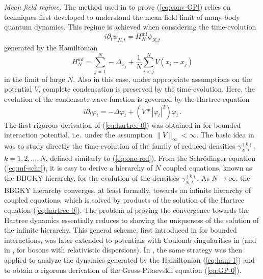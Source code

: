 \documentclass[11pt,a4paper]{article}
\begin{document}
\bigskip

{\it Mean field regime.} The method used in \cite{ESY0,ESY1,ESY2,ESY3,ESY4} 
to prove (\ref{eq:conv-GP}) relies on techniques first developed to understand the mean field limit of many-body quantum dynamics. This regime is achieved when considering the time-evolution 
\begin{equation}\label{eq:mf-schr}
i\partial_t \psi_{N,t} = H_N^{\text{mf}} \psi_{N,t} 
\end{equation}
generated by the Hamiltonian
\begin{equation}\label{eq:ham-mf} H_N^{\text{mf}} = \sum_{j=1}^N -\Delta_{x_j} + \frac{1}{N} \sum_{i<j}^N V (x_i -x_j) \end{equation}
in the limit of large $N$. Also in this case, under appropriate assumptions on the potential $V$, 
complete condensation is preserved by the time-evolution. Here, the evolution of the condensate wave function is governed by the Hartree equation
\begin{equation}\label{eq:hartree-0} i\partial_t \varphi_t = -\Delta \varphi_t + \left( V * |\varphi_t|^2\right) \varphi_t \,. \end{equation}
The first rigorous derivation of (\ref{eq:hartree-0}) was obtained in \cite{S} for bounded interaction potential, i.e.\ under the assumption $\| V \|_\infty < \infty$. The basic idea in \cite{S} was to study directly the time-evolution of the family of reduced densities $\gamma^{(k)}_{N,t}$, $k =1 ,2, \dots , N$, defined similarly to (\ref{eq:one-red}).  {F}rom the Schr\"odinger equation (\ref{eq:mf-schr}), it is easy to derive a hierarchy of $N$ coupled equations, known as the BBGKY hierarchy, for the evolution of the densities $\gamma^{(k)}_{N,t}$. As $N \to \infty$, the BBGKY hierarchy converges, at least formally, towards an infinite hierarchy of coupled equations, which is solved by products of the solution of the Hartree equation (\ref{eq:hartree-0}). The problem of proving the convergence towards the Hartree dynamics essentially reduces to showing the uniqueness of the solution of the infinite hierarchy. This general scheme, first introduced in \cite{S} for bounded interactions, was later extended to potentials with Coulomb singularities in \cite{EY} (and in \cite{ES}, for bosons with relativistic dispersions). In \cite{ESY1,ESY2,ESY3,ESY4}, the same strategy was then applied to analyze the dynamics generated by the Hamiltonian (\ref{eq:ham-1}) and to obtain a rigorous derivation of the Gross-Pitaevskii equation (\ref{eq:GP-0}). 
\end{document}
